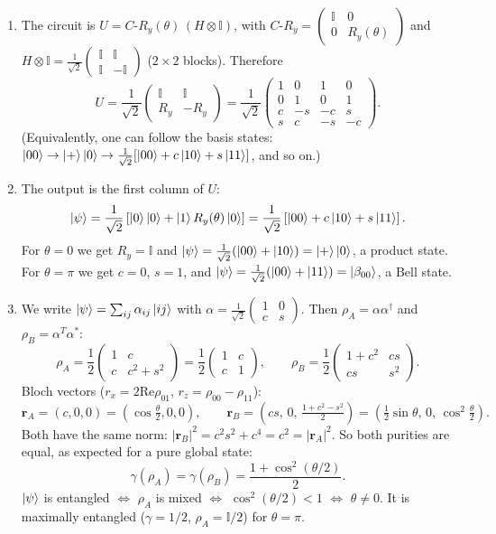 \documentclass[11pt,a4paper]{article}
\newcommand{\id}{\mathbb{I}}
\begin{document}
\begin{enumerate}
\item The circuit is $U=C\text{-}R_y(\theta)\,(H\otimes\id)$, with
$C\text{-}R_y=\begin{pmatrix}\id&0\\0&R_y(\theta)\end{pmatrix}$ and
$H\otimes\id=\frac1{\sqrt2}\begin{pmatrix}\id&\id\\ \id&-\id\end{pmatrix}$ ($2\times2$ blocks). Therefore
\[
U=\frac1{\sqrt2}\begin{pmatrix}\id&\id\\ R_y&-R_y\end{pmatrix}
=\frac1{\sqrt2}\begin{pmatrix}1&0&1&0\\0&1&0&1\\ c&-s&-c&s\\ s&c&-s&-c\end{pmatrix}.
\]
(Equivalently, one can follow the basis states: $\ket{00}\to\ket{+}\ket0\to\frac1{\sqrt2}[\ket{00}+c\ket{10}+s\ket{11}]$, and so on.)

\item The output is the first column of $U$:
\[
\ket\psi=\frac1{\sqrt2}\left[\ket0\ket0+\ket1 R_y(\theta)\ket0\right]
=\frac1{\sqrt2}\left[\ket{00}+c\ket{10}+s\ket{11}\right].
\]
For $\theta=0$ we get $R_y=\id$ and $\ket\psi=\frac1{\sqrt2}(\ket{00}+\ket{10})=\ket+\ket0$, a product
state. For $\theta=\pi$ we get $c=0$, $s=1$, and $\ket\psi=\frac1{\sqrt2}(\ket{00}+\ket{11})=\ket{\beta_{00}}$, a Bell state.

\item We write $\ket\psi=\sum_{ij}\alpha_{ij}\ket{ij}$ with
$\alpha=\frac1{\sqrt2}\begin{pmatrix}1&0\\c&s\end{pmatrix}$. Then $\rho_A=\alpha\alpha^\dagger$ and $\rho_B=\alpha^T\alpha^*$:
\[
\rho_A=\frac12\begin{pmatrix}1&c\\c&c^2+s^2\end{pmatrix}=\frac12\begin{pmatrix}1&c\\c&1\end{pmatrix},
\qquad
\rho_B=\frac12\begin{pmatrix}1+c^2&cs\\cs&s^2\end{pmatrix}.
\]
Bloch vectors ($r_x=2\mathrm{Re}\rho_{01}$, $r_z=\rho_{00}-\rho_{11}$):
\[
\bm r_A=(c,0,0)=\left(\cos\tfrac\theta2,0,0\right),\qquad
\bm r_B=\left(cs,\,0,\,\tfrac{1+c^2-s^2}{2}\right)=\left(\tfrac12\sin\theta,\,0,\,\cos^2\tfrac\theta2\right).
\]
Both have the same norm: $|\bm r_B|^2=c^2s^2+c^4=c^2=|\bm r_A|^2$. So both purities are equal, as
expected for a pure global state:
\[
\gamma(\rho_A)=\gamma(\rho_B)=\frac{1+\cos^2(\theta/2)}{2}.
\]
$\ket\psi$ is entangled $\iff$ $\rho_A$ is mixed $\iff$ $\cos^2(\theta/2)<1$ $\iff$ $\theta\neq0$.
It is maximally entangled ($\gamma=1/2$, $\rho_A=\id/2$) for $\theta=\pi$.


\end{enumerate}
\end{document}
